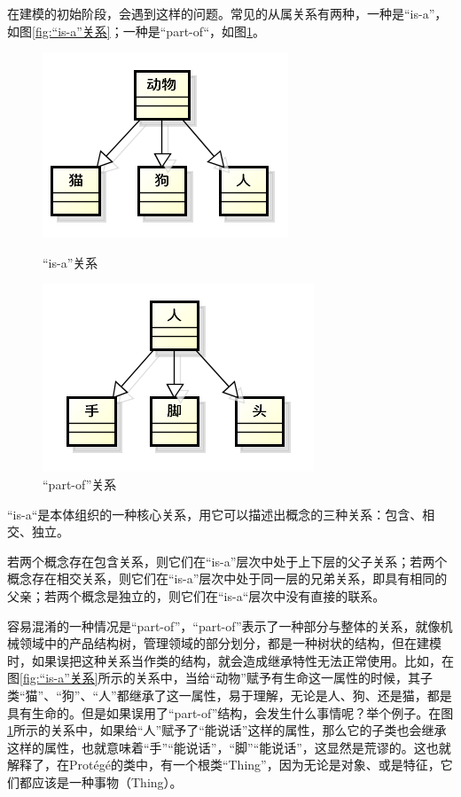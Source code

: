 \documentclass[12pt,a4paper]{article}
\begin{document}
	在建模的初始阶段，会遇到这样的问题。常见的从属关系有两种，一种是“is-a”，如图\ref{fig:“is-a”关系}；一种是“part-of“，如图\ref{fig:“part-of”关系}。
	\begin{figure}[htbp]
	\begin{minipage}[t]{0.5\linewidth}
	\centering
	\includegraphics[scale=1]{fig/isA.png}
	\caption{“is-a”关系}
	\label{fig:“is-a”关系}
	\end{minipage}
	\begin{minipage}[t]{0.5\linewidth}
	\centering
	\includegraphics[scale=1]{fig/partOf.png}
	\caption{“part-of”关系}
	\label{fig:“part-of”关系}
	\end{minipage}
	\end{figure}
	
	“is-a“是本体组织的一种核心关系，用它可以描述出概念的三种关系：包含、相交、独立。
	
	若两个概念存在包含关系，则它们在“is-a”层次中处于上下层的父子关系；若两个概念存在相交关系，则它们在“is-a”层次中处于同一层的兄弟关系，即具有相同的父亲；若两个概念是独立的，则它们在“is-a“层次中没有直接的联系。
	
	容易混淆的一种情况是“part-of”，“part-of”表示了一种部分与整体的关系，就像机械领域中的产品结构树，管理领域的部分划分，都是一种树状的结构，但在建模时，如果误把这种关系当作类的结构，就会造成继承特性无法正常使用。比如，在图\ref{fig:“is-a”关系}所示的关系中，当给“动物”赋予有生命这一属性的时候，其子类“猫”、“狗”、“人”都继承了这一属性，易于理解，无论是人、狗、还是猫，都是具有生命的。但是如果误用了“part-of”结构，会发生什么事情呢？举个例子。在图\ref{fig:“part-of”关系}所示的关系中，如果给“人”赋予了“能说话”这样的属性，那么它的子类也会继承这样的属性，也就意味着“手”“能说话”，“脚”“能说话”，这显然是荒谬的。这也就解释了，在Prot{\'e}g{\'e}的类中，有一个根类“Thing”，因为无论是对象、或是特征，它们都应该是一种事物（Thing）。
	
\end{document}
